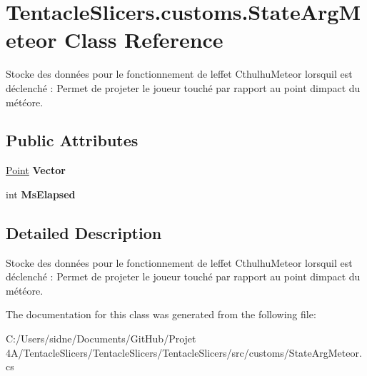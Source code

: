 \hypertarget{class_tentacle_slicers_1_1customs_1_1_state_arg_meteor}{}\section{Tentacle\+Slicers.\+customs.\+State\+Arg\+Meteor Class Reference}
\label{class_tentacle_slicers_1_1customs_1_1_state_arg_meteor}


Stocke des données pour le fonctionnement de l\textquotesingle{}effet Cthulhu\+Meteor lorsqu\textquotesingle{}il est déclenché \+: Permet de projeter le joueur touché par rapport au point d\textquotesingle{}impact du météore.  


\subsection*{Public Attributes}
\begin{DoxyCompactItemize}
\item 
\mbox{\label{class_tentacle_slicers_1_1customs_1_1_state_arg_meteor_ad8e5a0592fb439facd5259dcc28a1422}} 
\hyperlink{class_tentacle_slicers_1_1general_1_1_point}{Point} {\bfseries Vector}
\item 
\mbox{\label{class_tentacle_slicers_1_1customs_1_1_state_arg_meteor_ae3f2e00aafd47e2e6372b7a01f6dde6b}} 
int {\bfseries Ms\+Elapsed}
\end{DoxyCompactItemize}


\subsection{Detailed Description}
Stocke des données pour le fonctionnement de l\textquotesingle{}effet Cthulhu\+Meteor lorsqu\textquotesingle{}il est déclenché \+: Permet de projeter le joueur touché par rapport au point d\textquotesingle{}impact du météore. 



The documentation for this class was generated from the following file\+:\begin{DoxyCompactItemize}
\item 
C\+:/\+Users/sidne/\+Documents/\+Git\+Hub/\+Projet 4\+A/\+Tentacle\+Slicers/\+Tentacle\+Slicers/\+Tentacle\+Slicers/src/customs/State\+Arg\+Meteor.\+cs\end{DoxyCompactItemize}
